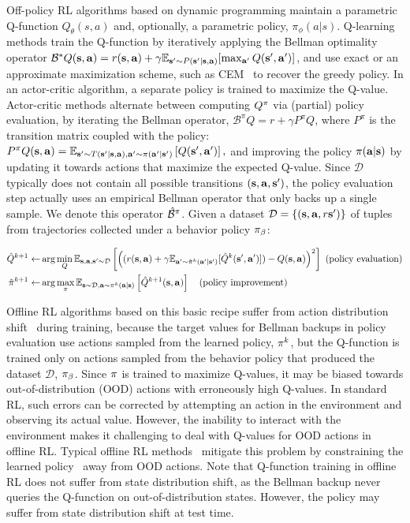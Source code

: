 Off-policy RL algorithms based on dynamic programming maintain a parametric Q-function $Q_\theta(s, a)$ and, optionally, a parametric policy, $\pi_\phi(a|s)$. 
Q-learning methods train the Q-function by iteratively applying the Bellman optimality operator \mbox{$\mathcal{B}^*Q(\mathbf{s}, \mathbf{a}) = r(\mathbf{s}, \mathbf{a}) + \gamma \mathbb{E}_{\mathbf{s}' \sim P(\mathbf{s}'|\mathbf{s}, \mathbf{a})}[\max_{\mathbf{a}'} Q(\mathbf{s}', \mathbf{a}')]$}, and use exact or an approximate maximization scheme, such as CEM~\citep{kalashnikov2018qtopt} to recover the greedy policy. In an actor-critic algorithm, a separate policy is trained to maximize the Q-value.
Actor-critic methods alternate between computing $Q^\pi$ via (partial) policy evaluation,
by iterating the Bellman operator, $\mathcal{B}^\pi Q= r + \gamma P^\pi Q$, where $P^\pi$ is the transition matrix coupled with the policy: $P^\pi Q(\mathbf{s}, \mathbf{a}) = \mathbb{E}_{\mathbf{s}' \sim T(\mathbf{s}' | \mathbf{s}, \mathbf{a}), \mathbf{a}' \sim \pi(\mathbf{a}'|\mathbf{s}')} \left[ Q(\mathbf{s}', \mathbf{a}') \right],$
and improving the policy
$\pi(\mathbf{a}|\mathbf{s})$ by updating it towards actions that maximize the expected Q-value. Since $\mathcal{D}$ typically does not contain all possible transitions $(\mathbf{s}, \mathbf{a}, \mathbf{s}')$, the policy evaluation step actually uses an empirical Bellman operator that only backs up a single sample. We denote this operator $\hat{\mathcal{B}}^\pi$. Given a dataset $\mathcal{D} = \{(\mathbf{s}, \mathbf{a}, r \mathbf{s}')\}$ of tuples from trajectories collected under a behavior policy ${\pi_\beta}$:
\begin{small}
\begin{align*}
    \hat{Q}^{k+1} \leftarrow& \arg\min_{Q} \mathbb{E}_{\mathbf{s}, \mathbf{a}, \mathbf{s}' \sim \mathcal{D}}\left[ \left((r(\mathbf{s}, \mathbf{a}) + \gamma \mathbb{E}_{\mathbf{a}' \sim \hat{\pi}^k(\mathbf{a}'|\mathbf{s}')}[\hat{Q}^{k}(\mathbf{s}', \mathbf{a}')]) - Q(\mathbf{s}, \mathbf{a})\right)^2 \right]~\text{(policy evaluation)}\\ 
    \hat{\pi}^{k+1} \leftarrow& \arg\max_{\pi} \mathbb{E}_{\mathbf{s} \sim \mathcal{D}, \mathbf{a} \sim \pi^k(\mathbf{a}|\mathbf{s})}\left[\hat{Q}^{k+1}(\mathbf{s}, \mathbf{a})\right]~~~ \text{(policy improvement)} 
\end{align*}
\end{small}
Offline RL algorithms based on this basic recipe suffer from action distribution shift~\citep{kumar2019stabilizing,wu2019behavior,jaques2019way,levine2020offline} during training, because the target values for Bellman backups in policy evaluation use actions sampled from the learned policy, $\pi^k$, but the Q-function is trained only on actions sampled from the behavior policy that produced the dataset $\mathcal{D}$, ${\pi_\beta}$. Since $\pi$ is trained to maximize Q-values, it may be biased towards out-of-distribution (OOD) actions with erroneously high Q-values. In standard RL, such errors can be corrected by attempting an action in the environment and observing its actual value. However, the inability to interact with the environment makes it challenging to deal with Q-values for OOD actions in offline RL. Typical offline RL methods~\citep{kumar2019stabilizing,jaques2019way,wu2019behavior,siegel2020keep} mitigate this problem by constraining the learned policy~\citep{levine2020offline} away from OOD actions. {Note that Q-function training in offline RL does not suffer from state distribution shift, as the Bellman backup never queries the Q-function on out-of-distribution states. However, the policy may suffer from state distribution shift at test time.}
